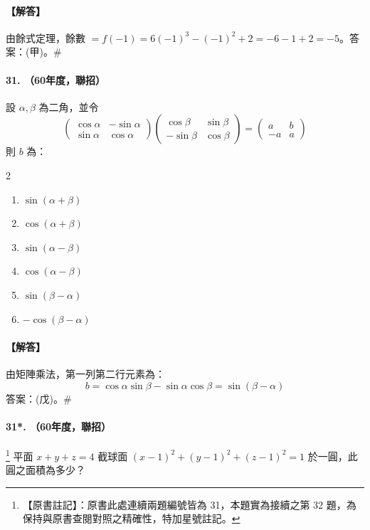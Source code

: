 \paragraph{【解答】}
由餘式定理，餘數 $= f(-1) = 6(-1)^3 - (-1)^2 + 2 = -6-1+2 = -5$。答案：(甲)。\hfill$\#$

\paragraph{31. （60年度，聯招）}
設 $\alpha, \beta$ 為二角，並令
\[ \begin{pmatrix} \cos\alpha & -\sin\alpha \\ \sin\alpha & \cos\alpha \end{pmatrix} \begin{pmatrix} \cos\beta & \sin\beta \\ -\sin\beta & \cos\beta \end{pmatrix} = \begin{pmatrix} a & b \\ -a & a \end{pmatrix} \]
則 $b$ 為：
\begin{multicols}{2}
\begin{enumerate}[label=\tiangan*]
  \item $\sin(\alpha+\beta)$
  \item $\cos(\alpha+\beta)$
  \item $\sin(\alpha-\beta)$
  \item $\cos(\alpha-\beta)$
  \item $\sin(\beta-\alpha)$
  \item $-\cos(\beta-\alpha)$
\end{enumerate}
\end{multicols}

\paragraph{【解答】}
由矩陣乘法，第一列第二行元素為：
\[ b = \cos\alpha\sin\beta - \sin\alpha\cos\beta = \sin(\beta-\alpha) \]
答案：(戊)。\hfill$\#$

\paragraph{31*. （60年度，聯招）}\label{note:b6-ch4-p172-prob-dup}\footnote{【原書註記】：原書此處連續兩題編號皆為 31，本題實為接續之第 32 題，為保持與原書查閱對照之精確性，特加星號註記。}
平面 $x+y+z=4$ 截球面 $(x-1)^2+(y-1)^2+(z-1)^2=1$ 於一圓，此圓之面積為多少？

